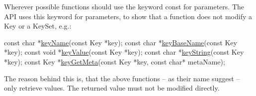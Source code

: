 Wherever possible functions should use the keyword {\ttfamily const} for parameters. The A\+PI uses this keyword for parameters, to show that a function does not modify a {\ttfamily Key} or a {\ttfamily Key\+Set}, e.\+g.\+:


\begin{DoxyCode}
\textcolor{keyword}{const} \textcolor{keywordtype}{char} *\hyperlink{group__keyname_ga8e805c726a60da921d3736cda7813513}{keyName}(\textcolor{keyword}{const} Key *key);
\textcolor{keyword}{const} \textcolor{keywordtype}{char} *\hyperlink{group__keyname_gaaff35e7ca8af5560c47e662ceb9465f5}{keyBaseName}(\textcolor{keyword}{const} Key *key);
\textcolor{keyword}{const} \textcolor{keywordtype}{void} *\hyperlink{group__keyvalue_ga6f29609c5da53c6dc26a98678d5752af}{keyValue}(\textcolor{keyword}{const} Key *key);
\textcolor{keyword}{const} \textcolor{keywordtype}{char} *\hyperlink{group__keyvalue_ga880936f2481d28e6e2acbe7486a21d05}{keyString}(\textcolor{keyword}{const} Key *key);
\textcolor{keyword}{const} Key  *\hyperlink{group__keymeta_ga9ed3875495ddb3d8a8d29158a60a147c}{keyGetMeta}(\textcolor{keyword}{const} Key *key, \textcolor{keyword}{const} \textcolor{keywordtype}{char}* metaName);
\end{DoxyCode}


The reason behind this is, that the above functions – as their name suggest – only retrieve values. The returned value must not be modified directly. 